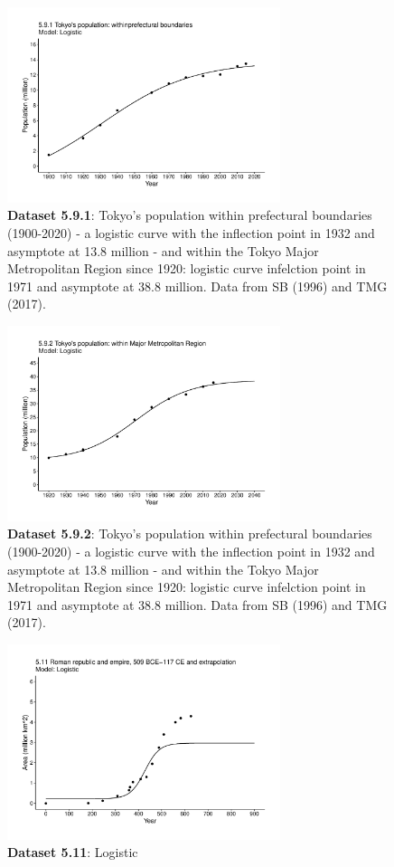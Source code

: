 \documentclass[aps,rmp,preprint,superscriptaddress,10pt,onecolumn]{article}
\begin{document}
\begin{figure}[h]
\includegraphics[width=8cm]{output/figs-ggplot/5.9.1.pdf}
\caption{\textbf{Dataset 5.9.1}: Tokyo's population within prefectural boundaries (1900-2020) - a logistic curve with the inflection point in 1932 and asymptote at 13.8 million - and within the Tokyo Major Metropolitan Region since 1920: logistic curve infelction point in 1971 and asymptote at 38.8 million. Data from SB (1996) and TMG (2017). }
\end{figure}
	
\begin{figure}[h]
\includegraphics[width=8cm]{output/figs-ggplot/5.9.2.pdf}
\caption{\textbf{Dataset 5.9.2}: Tokyo's population within prefectural boundaries (1900-2020) - a logistic curve with the inflection point in 1932 and asymptote at 13.8 million - and within the Tokyo Major Metropolitan Region since 1920: logistic curve infelction point in 1971 and asymptote at 38.8 million. Data from SB (1996) and TMG (2017). }
\end{figure}
	
\begin{figure}[h]
\includegraphics[width=8cm]{output/figs-ggplot/5.11.pdf}
\caption{\textbf{Dataset 5.11}: Logistic}
\end{figure}
	
\end{document}

